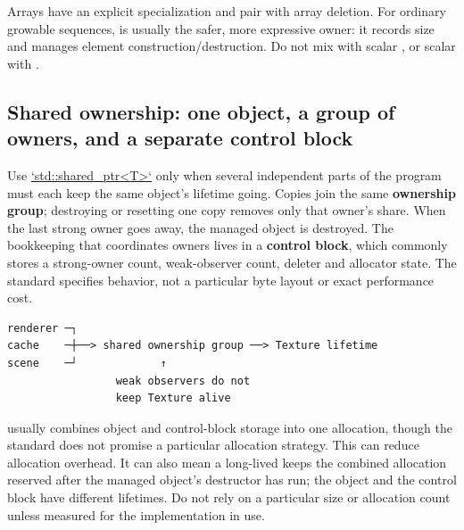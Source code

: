 Arrays have an explicit  specialization and pair with array deletion. For ordinary growable sequences,  is usually the safer, more expressive owner: it records size and manages element construction/destruction. Do not mix  with scalar , or scalar  with .

\subsection{Shared ownership: one object, a group of owners, and a separate control block}\label{01-foundations-i-ch004-shared-ownership-one-object-a-group-of-owners-and-a-separate-control-block}

\hypertarget{01-foundations-i-ch004-shared-ownership-one-object-a-group-of-owners-and-a-separate-control-block}{}

Use \hyperref[appendix-51602cabe815]{`std::shared\_ptr\textless T\textgreater`} only when several independent parts of the program must each keep the same object's lifetime going. Copies join the same \textbf{ownership group}; destroying or resetting one copy removes only that owner's share. When the last strong owner goes away, the managed object is destroyed. The bookkeeping that coordinates owners lives in a \textbf{control block}, which commonly stores a strong-owner count, weak-observer count, deleter and allocator state. The standard specifies behavior, not a particular byte layout or exact performance cost.

\begin{verbatim}
renderer ─┐
cache    ─┼──> shared ownership group ──> Texture lifetime
scene    ─┘             ↑
                 weak observers do not
                 keep Texture alive
\end{verbatim}

 usually combines object and control-block storage into one allocation, though the standard does not promise a particular allocation strategy. This can reduce allocation overhead. It can also mean a long-lived  keeps the combined allocation reserved after the managed object's destructor has run; the object and the control block have different lifetimes. Do not rely on a particular size or allocation count unless measured for the implementation in use.

